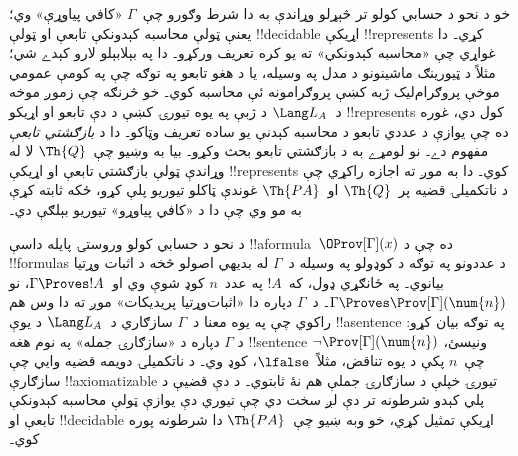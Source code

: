 \documentclass[../../../include/open-logic-section]{subfiles}
\begin{document}
خو د نحو د حسابي کولو تر څېړلو وړاندې به دا شرط وګورو چې~$\Gamma$
«کافي پياوړې» وي؛ يعنې ټولې محاسبه کېدونکې تابعې او ټولې
!!{decidable} اړيکې !!{represents} کړي۔ دا غواړي چې «محاسبه کېدونکي»
ته يو کره تعريف ورکړو۔ دا په بېلابېلو لارو کېدے شي؛ مثلاً د ټيورينګ
ماشينونو د مدل په وسيله، يا د هغو تابعو په توګه چې په کومې عمومي
موخې پروګرام‌ليک ژبه کښې پروګرامونه ئې محاسبه کوي۔ خو څرنګه چې زموږ
موخه د~$\Lang L_A$ د ژبې په يوه تيورۍ کښې د دې تابعو او اړيکو
!!{represents} کول دي، غوره ده چې يوازې د عددي تابعو د محاسبه کېدنې يو ساده تعريف
وټاکو۔ دا د \emph{بازګشتي تابعې} مفهوم دے۔ نو لومړے به د بازګشتي
تابعو بحث وکړو۔ بيا به وښيو چې~$\Th{Q}$ لا له وړاندې ټولې بازګشتي
تابعې او اړيکې !!{represents} کوي۔ دا به موږ ته اجازه راکړي چې د
ناتکميلۍ قضيه پر~$\Th{Q}$ او~$\Th{PA}$ غوندې ټاکلو تيوريو پلې کړو،
ځکه ثابته کړې به مو وي چې دا د «کافي پياوړو» تيوريو بېلګې دي۔

د نحو د حسابي کولو وروستۍ پايله داسې !!a{formula}~$\OProv[\Gamma](x)$
ده چې د !!{formula}s د عددونو په توګه د کوډولو په وسيله د~$\Gamma$
له بديهي اصولو څخه د اثبات وړتيا بيانوي۔ په ځانګړي ډول، که~$!A$ په
عدد~$n$ کوډ شوې وي او~$\Gamma \Proves !A$، نو
$\Gamma \Proves \Prov[\Gamma](\num{n})$۔ د~$\Gamma$ دپاره دا
«اثبات‌وړتيا پريديکات» موږ ته دا وس هم راکوي چې په يوه معنا د~$\Gamma$
سازګاري د~$\Lang L_A$ د يوې !!a{sentence} په توګه بيان کړو: د
$\Gamma$ دپاره د «سازګارۍ جمله» په نوم هغه !!{sentence}
$\lnot \Prov[\Gamma](\num{n})$ ونيسئ، چې~$n$ پکې د يوه تناقض،
مثلاً~$\lfalse$، کوډ وي۔ د ناتکميلۍ
دويمه قضيه وايي چې سازګارې !!{axiomatizable} تيورۍ خپلې د سازګارۍ
جملې هم نۀ ثابتوي۔ د دې قضيې د پلي کېدو شرطونه تر دې لږ سخت دي چې
تيوري دې يوازې ټولې محاسبه کېدونکې تابعې او !!{decidable} اړيکې
تمثيل کړي، خو وبه ښيو چې~$\Th{PA}$ دا شرطونه پوره کوي۔
\end{document}
